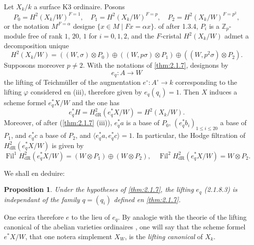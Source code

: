 \documentclass[12pt,a4paper]{article}
\theoremstyle{plain}
\newtheorem{proposition}[theorem]{Proposition}
\theoremstyle{definition}
\theoremstyle{remark}
\DeclareMathOperator{\Fil}{Fil}
\begin{document}
\subsubsection{}
Let $X_k/k$ a surface K3 ordinaire. Posons
\begin{equation}\tag{2.1.8.1}
P_0 = H^2(X_k/W)^{F=1}, \quad P_1 = H^2(X_k/W)^{F=p}, \quad P_2 = H^2(X_k/W)^{F=p^2}, 
\end{equation}
or the notation $M^{F=\alpha}$ designe $\{x \in M \mid Fx = \alpha x\}$. of after 1.3.4, $P_i$ is a $\mathbb{Z}_p$-module free of rank $1$, $20$, $1$ for $i = 0, 1, 2$, and the $F$-cristal $H^2(X_k/W)$ admet a decomposition unique
\begin{equation}\tag{2.1.8.2}
H^2(X_k/W) = ((W, \sigma) \otimes P_0) \oplus ((W, p\sigma) \otimes P_1) \oplus ((W, p^2\sigma) \otimes P_2). 
\end{equation}
Supposons moreover $p \neq 2$. With the notations of \ref{thm:2.1.7}, designons by
\begin{equation}\tag{2.1.8.3}
e_q : A \longrightarrow W 
\end{equation}
the lifting of Teichm\"uller of the augmentation $e^\circ : A^\circ \to k$ corresponding to the lifting $\varphi$ considered en (iii), therefore given by $e_q(q_i) = 1$. Then $X$ induces a scheme formel $e_q^*X/W$ and the one has
\begin{equation}\tag{2.1.8.4}
e_q^* H = H^2_\mathrm{dR}(e_q^*X/W) = H^2(X_k/W). 
\end{equation}
Moreover, of after (\ref{thm:2.1.7} (iii)), $e_q^* a$ is a base of $P_0$, $(e_q^* b_i)_{1\leqslant i\leqslant 20}$ a base of $P_1$, and $e_q^* c$ a base of $P_2$, and $\langle e_q^* a, e_q^* c \rangle = 1$. In particular, the Hodge filtration of $H^2_\mathrm{dR}(e_q^*X/W)$ is given by
\begin{equation}\tag{2.1.8.5}
\Fil^1 H^2_\mathrm{dR}(e_q^*X/W) = (W \otimes P_1) \oplus (W \otimes P_2), \quad \Fil^2 H^2_\mathrm{dR}(e_q^*X/W) = W \otimes P_2. 
\end{equation}

We shall en deduire:

\begin{proposition}\label{prop:2.1.9}
Under the hypotheses of \ref{thm:2.1.7}, the lifting $e_q$ (2.1.8.3) is independant of the family $q = (q_i)$ defined en \ref{thm:2.1.7}.
\end{proposition}

One ecrira therefore $e$ to the lieu of $e_q$. By analogie with the theorie of the lifting canonical of the abelian varieties ordinaires \cite[\S V \S 3]{Messing}, one will say that the scheme formel $e^*X/W$, that one notera simplement $X_W$, is the \emph{lifting canonical} of $X_k$.
\end{document}
